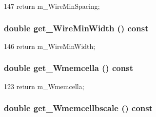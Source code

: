 \begin{DoxyCode}
147 { return m_WireMinSpacing; }
\end{DoxyCode}
\hypertarget{classTechParameter_a01073ecad479898141a113610ad892c2}{
\subsubsection[{get\_\-WireMinWidth}]{\setlength{\rightskip}{0pt plus 5cm}double get\_\-WireMinWidth () const}}
\label{classTechParameter_a01073ecad479898141a113610ad892c2}



\begin{DoxyCode}
146 { return m_WireMinWidth; }
\end{DoxyCode}
\hypertarget{classTechParameter_ac5fffd2125dc51bcacd7b36db046f93f}{
\subsubsection[{get\_\-Wmemcella}]{\setlength{\rightskip}{0pt plus 5cm}double get\_\-Wmemcella () const}}
\label{classTechParameter_ac5fffd2125dc51bcacd7b36db046f93f}



\begin{DoxyCode}
123 { return m_Wmemcella; }
\end{DoxyCode}
\hypertarget{classTechParameter_a5c685a1e75769a78690fee7f449228f2}{
\subsubsection[{get\_\-Wmemcellbscale}]{\setlength{\rightskip}{0pt plus 5cm}double get\_\-Wmemcellbscale () const}}
\label{classTechParameter_a5c685a1e75769a78690fee7f449228f2}



